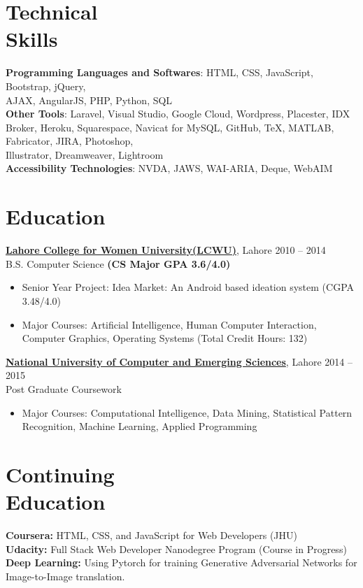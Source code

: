 \documentclass[margin,line]{res}
\begin{document}
\begin{resume}
\section{Technical \\Skills}
{\noindent\bf Programming Languages and Softwares}: HTML, CSS,  JavaScript, Bootstrap, jQuery, \\AJAX, AngularJS, PHP, Python, SQL
\\{\bf Other Tools}: Laravel, Visual Studio, Google Cloud, Wordpress, Placester, IDX Broker, Heroku, Squarespace, Navicat for MySQL, GitHub, \TeX, MATLAB, Fabricator, JIRA, Photoshop, \\Illustrator, Dreamweaver, Lightroom\\
{\bf Accessibility Technologies}: NVDA, JAWS, WAI-ARIA, Deque, WebAIM


\section{Education} 

\href{http://www.lcwu.edu.pk/}{\noindent\bf Lahore College for Women University(LCWU)}, Lahore \hfill 2010 -- 2014\\ B.S. Computer Science \hfill\textbf{(CS Major GPA 3.6/4.0)}
\begin{itemize} \itemsep -2pt  %
 \item Senior Year Project: Idea Market: An Android based ideation system \hfill(CGPA 3.48/4.0)
 \item  Major Courses: Artificial Intelligence, Human Computer Interaction,\\ Computer Graphics, Operating Systems (Total Credit Hours: 132)
 \end{itemize}

\href{http://www.nu.edu.pk/}{\noindent\bf National University of Computer and Emerging Sciences}, Lahore \hfill 2014 -- 2015\\ Post Graduate Coursework \hfill\
\begin{itemize} \itemsep -2pt  %
 \item Major Courses: Computational Intelligence, Data Mining, Statistical Pattern Recognition, Machine Learning, Applied Programming
 \end{itemize}


\section{Continuing \\Education}
{\noindent\bf Coursera:} HTML, CSS, and JavaScript for Web Developers (JHU)\\
{\bf  Udacity:} Full Stack Web Developer Nanodegree Program (Course in Progress)\\
{\bf Deep Learning:} Using Pytorch for training Generative Adversarial Networks for Image-to-Image translation. 


\end{resume}
\end{document}
